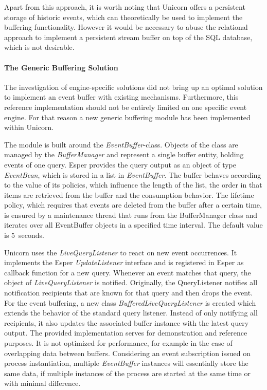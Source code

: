 Apart from this approach, it is worth noting that Unicorn offers a persistent storage of historic events, which can theoretically be used to implement the buffering functionality.
However it would be necessary to abuse the relational approach to implement a persistent stream buffer on top of the SQL database, which is not desirable.

\paragraph{The Generic Buffering Solution}
The investigation of engine-specific solutions did not bring up an optimal solution to implement an event buffer with existing mechanisms.
Furthermore, this reference implementation should not be entirely limited on one specific event engine.
For that reason a new generic buffering module has been implemented within Unicorn. 

The module is built around the \textit{EventBuffer}-class. Objects of the class are managed by the \textit{BufferManager} and represent a single buffer entity, holding events of one query. Esper provides the query output as an object of type \textit{EventBean}, which is stored in a list in \textit{EventBuffer}.
The buffer behaves according to the value of its policies, which influence the length of the list, the order in that items are retrieved from the buffer and the consumption behavior.
The lifetime policy, which requires that events are deleted from the buffer after a certain time, is ensured by a maintenance thread that runs from the BufferManager class and iterates over all EventBuffer objects in a specified time interval. The default value is 5~seconds.

Unicorn uses the \textit{LiveQueryListener} to react on new event occurrences. It implements the Esper \textit{UpdateListener} interface and is registered in Esper as callback function for a new query. Whenever an event matches that query, the object of \textit{LiveQueryListener} is notified.
Originally, the QueryListener notifies all notification recipients that are known for that query and then drops the event.
For the event buffering, a new class \textit{BufferedLiveQueryListener} is created which extends the behavior of the standard query listener. Instead of only notifying all recipients, it also updates the associated buffer instance with the latest query output.
The provided implementation serves for demonstration and reference purposes. It is not optimized for performance, for example in the case of overlapping data between buffers. Considering an event subscription issued on process instantiation, multiple \textit{EventBuffer} instances will essentially store the same data, if multiple instances of the process are started at the same time or with minimal difference.

